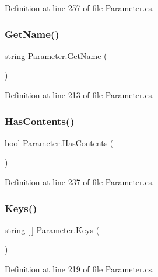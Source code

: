 Definition at line 257 of file Parameter.\+cs.

\mbox{\label{class_parameter_a8bf905caadd44b95a499ef7950805264}} 
\subsubsection{\texorpdfstring{Get\+Name()}{GetName()}}
{\footnotesize\ttfamily string Parameter.\+Get\+Name (\begin{DoxyParamCaption}{ }\end{DoxyParamCaption})}



Definition at line 213 of file Parameter.\+cs.

\mbox{\label{class_parameter_aab7d76dd5beeccefe44936b6cf8b2598}} 
\subsubsection{\texorpdfstring{Has\+Contents()}{HasContents()}}
{\footnotesize\ttfamily bool Parameter.\+Has\+Contents (\begin{DoxyParamCaption}{ }\end{DoxyParamCaption})}



Definition at line 237 of file Parameter.\+cs.

\mbox{\label{class_parameter_a09ccb200567240478710aa444e7dd3ec}} 
\subsubsection{\texorpdfstring{Keys()}{Keys()}}
{\footnotesize\ttfamily string \mbox{[}$\,$\mbox{]} Parameter.\+Keys (\begin{DoxyParamCaption}{ }\end{DoxyParamCaption})}



Definition at line 219 of file Parameter.\+cs.

\mbox{\label{class_parameter_ae81e5829c0eabcae1d59f3e3f9623ab6}} 

